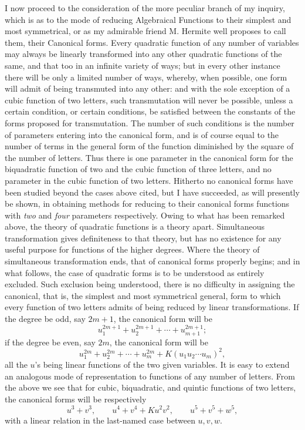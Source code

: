 \documentclass[11pt]{article}
\begin{document}
{{I now proceed to the consideration of the more peculiar branch of my inquiry, which is as to the mode of reducing Algebraical Functions to their simplest and most symmetrical, or as my admirable friend M. Hermite well proposes to call them, their Canonical forms. Every quadratic function of any number of variables may always be linearly transformed into any other quadratic functions of the same, and that too in an infinite variety of ways; but in every other instance there will be only a limited number of ways, whereby, when possible, one form will admit of being transmuted into any other: and with the sole exception of a cubic function of two letters, such transmutation will never be possible, unless a certain condition, or certain conditions, be satisfied between the constants of the forms proposed for transmutation. The number of such conditions is the number of parameters entering into the canonical form, and is of course equal to the number of terms in the general form of the function diminished by the square of the number of letters. Thus there is one parameter in the canonical form for the biquadratic function of two and the cubic function of three letters, and no parameter in the cubic function of two letters. Hitherto no canonical forms have been studied beyond the cases above cited, but I have succeeded, as will presently be shown, in obtaining methods for reducing to their canonical forms functions with \emph{two} and \emph{four} parameters respectively. Owing to what has been remarked above, the theory of quadratic functions is a theory apart. Simultaneous transformation gives definiteness to that theory, but has no existence for any useful purpose for functions of the higher degrees. Where the theory of simultaneous transformation ends, that of canonical forms properly begins; and in what follows, the case of quadratic forms is to be understood as entirely excluded. Such exclusion being understood, there is no difficulty in assigning the canonical, that is, the simplest and most symmetrical general, form to which every function of two letters admits of being reduced by linear transformations. If the degree be odd, say $2m+1$, the canonical form will be
\[
 u_1^{2m+1}+u_2^{2m+1}+\cdots+u_{m+1}^{2m+1};
\]
if the degree be even, say $2m$, the canonical form will be
\[
 u_1^{2m}+u_2^{2m}+\cdots+u_m^{2m}+K(u_1u_2\cdots u_m)^2,
\]
all the $u$'s being linear functions of the two given variables. It is easy to extend an analogous mode of representation to functions of any number of letters. From the above we see that for cubic, biquadratic, and quintic functions of two letters, the canonical forms will be respectively
\[
 u^3+v^3,\qquad u^4+v^4+Ku^2v^2,\qquad u^5+v^5+w^5,
\]
with a linear relation in the last-named case between $u,v,w$.

}}
\end{document}
